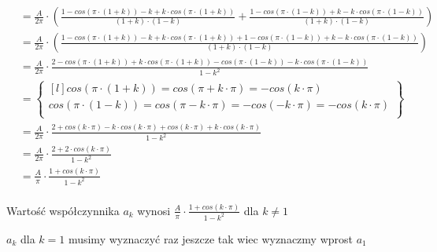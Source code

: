 \begin{align*}
&=\frac{A}{2\pi} \cdot \left(\frac{1 - cos\left(\pi \cdot \left(1+k\right) \right)- k + k\cdot cos\left(\pi \cdot \left(1+k\right) \right)}{\left(1+k\right)\cdot\left(1-k\right)} + \frac{1 - cos\left(\pi \cdot \left(1-k\right)\right)+ k - k\cdot cos\left(\pi \cdot \left(1-k\right)\right)}{\left(1+k\right)\cdot\left(1-k\right)} \right)\\
&=\frac{A}{2\pi} \cdot \left(\frac{1 - cos\left(\pi \cdot \left(1+k\right) \right)- k + k\cdot cos\left(\pi \cdot \left(1+k\right) \right) + 1 - cos\left(\pi \cdot \left(1-k\right)\right)+ k - k\cdot cos\left(\pi \cdot \left(1-k\right)\right)}{\left(1+k\right)\cdot\left(1-k\right)} \right)\\
&=\frac{A}{2\pi} \cdot \frac{2 - cos\left(\pi \cdot \left(1+k\right) \right) + k\cdot cos\left(\pi \cdot \left(1+k\right) \right) - cos\left(\pi \cdot \left(1-k\right)\right) - k\cdot cos\left(\pi \cdot \left(1-k\right)\right)}{1-k^2}\\
&=\begin{Bmatrix*}[l]
cos\left(\pi\cdot\left(1+k\right)\right)=cos\left(\pi+k \cdot\pi\right)=-cos\left(k\cdot\pi\right)\\
cos\left(\pi\cdot\left(1-k\right)\right)=cos\left(\pi-k \cdot\pi\right)=-cos\left(-k\cdot\pi\right) = -cos\left(k\cdot\pi\right)\\
\end{Bmatrix*}\\
&=\frac{A}{2\pi} \cdot \frac{2 + cos\left(k\cdot\pi \right) - k\cdot cos\left(k\cdot\pi \right) + cos\left(k\cdot\pi\right) + k\cdot cos\left(k\cdot\pi\right)}{1-k^2}\\
&=\frac{A}{2\pi} \cdot \frac{2 + 2\cdot cos\left(k\cdot\pi \right)}{1-k^2}\\
&=\frac{A}{\pi} \cdot \frac{1 + cos\left(k\cdot\pi \right)}{1-k^2}\\
\end{align*}

Wartość współczynnika $a_k$ wynosi $\frac{A}{\pi} \cdot \frac{1 + cos\left(k\cdot\pi \right)}{1-k^2}$ dla $k \neq 1$

$a_k$ dla $k=1$ musimy wyznaczyć raz jeszcze tak wiec wyznaczmy wprost $a_1$

